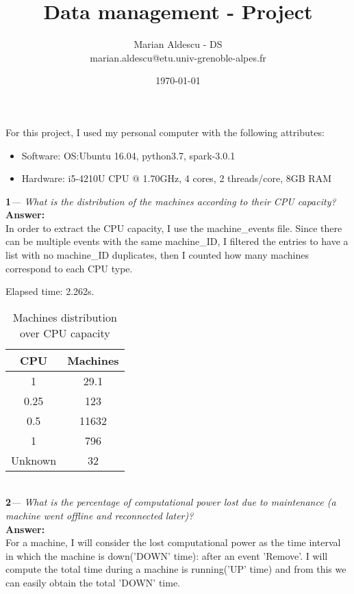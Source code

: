 \documentclass{article}
\title{Data management - Project}
\author{Marian Aldescu - DS\\ marian.aldescu@etu.univ-grenoble-alpes.fr}
\date{\today}
\begin{document}
\maketitle

\large{For this project, I used my personal computer with the following attributes:}
\begin{itemize}
	\item Software: OS:Ubuntu 16.04, python3.7, spark-3.0.1
	\item Hardware: i5-4210U CPU @ 1.70GHz, 4 cores, 2 threads/core, 8GB RAM\\
\end{itemize}

\large{\textbf{1}\textit{— What is the distribution of the machines according to their CPU capacity?\\} }
\textbf{Answer:}\\
	In order to extract the CPU capacity, I use the machine\_events file. Since there can be multiple events with the same machine\_ID, I filtered the entries to have a list with no machine\_ID duplicates, then I counted how many machines correspond to each CPU type.
	
	Elapsed time: 2.262s.
	\begin{table}[h!]
		\begin{center}
			\begin{tabular}{|c | c |} 
				\hline
				CPU & Machines\\ [0.5ex] 
				\hline\hline
				1  		& 	29.1  \\ [0.5ex] \hline
				0.25  	& 123 \\ [0.5ex] \hline
				0.5  	& 11632  \\ [0.5ex] \hline
				1  		& 796  \\ [0.5ex] \hline
				Unknown  & 32  \\ [0.5ex] \hline
			\end{tabular}
			\caption{ Machines distribution over CPU capacity}
			\label{table_mutation_rate}
		\end{center}
	\end{table}\\


\large{\textbf{2}\textit{— What is the percentage of computational power lost due to maintenance (a machine went
		offline and reconnected later)?\\} }
\textbf{Answer:}\\
For a machine, I will consider the lost computational power as the time interval in which the machine is down('DOWN' time): after an event 'Remove'. I will compute the total time during a machine is running('UP' time) and from this we can easily obtain the total 'DOWN' time.
\end{document}
